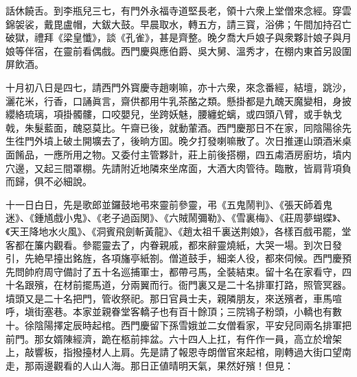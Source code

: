 話休饒舌。到李瓶兒三七，有門外永福寺道堅長老，領十六衆上堂僧來念經。穿雲錦袈裟，戴毘盧帽，大鈸大鼓。早晨取水，轉五方，請三寳，浴佛；午間加持召亡破獄，禮拜《梁皇懺》，談《孔雀》，甚是齊整。晚夕喬大戶娘子與衆夥計娘子與月娘等伴宿，在靈前看偶戲。西門慶與應伯爵、吳大舅、溫秀才，在棚内東首另設圍屏飲酒。

十月初八日是四七，請西門外寳慶寺趙喇嘛，亦十六衆，來念番經，結壇，跳沙，灑花米，行香，口誦眞言，齋供都用牛乳茶酪之類。懸掛都是九醜天魔變相，身披纓絡琉璃，項掛髑髏，口咬嬰兒，坐跨妖魅，腰纏蛇螭，或四頭八臂，或手執戈戟，朱髮藍面，醜惡莫比。午齋已後，就動葷酒。西門慶那日不在家，同陰陽徐先生徃門外墳上破土開壙去了，後晌方囬。晚夕打發喇嘛散了。次日推運山頭酒米桌面餚品，一應所用之物。又委付主管夥計，莊上前後搭棚，四五䖏酒房廚坊，墳内穴邊，又起三間罩棚。先請附近地隣來坐席面，大酒大肉管待。臨散，皆肩背項負而歸，俱不必細說。

十一日白日，先是歌郎並鑼鼓地弔來靈前參靈，弔《五鬼鬧判》、《張天師着鬼迷》、《鍾馗戲小鬼》、《老子過函関》、《六賊鬧彌勒》、《雪裏梅》、《莊周夢蝴蝶》、《天王降地水火風》、《洞賓飛劍斬黃龍》、《趙太祖千裏送荆娘》，各樣百戲弔罷，堂客都在簾内觀看。參罷靈去了，内眷親戚，都來辭靈燒紙，大哭一場。到次日發引，先絶早擡出銘旌，各項旛亭紙劄。僧道鼓手，細楽人役，都來伺候。西門慶預先問帥府周守備討了五十名巡捕軍士，都帶弓馬，全裝結束。留十名在家看守，四十名跟殯，在材前擺馬道，分兩翼而行。衙門裏又是二十名排軍打路，照管冥器。墳頭又是二十名把門，管收祭祀。那日官員士夫，親隣朋友，來送殯者，車馬喧呼，塡街塞巷。本家並親眷堂客轎子也有百十餘頂；三院鴇子粉頭，小轎也有數十。徐陰陽擇定辰時起棺。西門慶留下孫雪娥並二女僧看家，平安兒同兩名排軍把前門。那女婿陳經濟，跪在柩前摔盆。六十四人上扛，有仵作一員，高立於增架上，敲響板，指撥擡材人上肩。先是請了報恩寺朗僧官來起棺，剛轉過大街口望南走，那兩邊觀看的人山人海。那日正値晴明天氣，果然好殯！但見：

